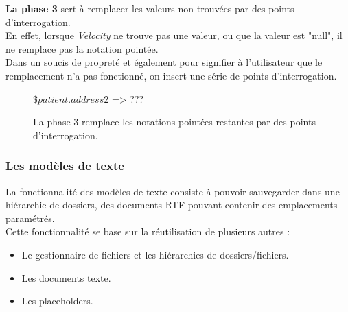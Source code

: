 \textbf{La phase 3} sert à remplacer les valeurs non trouvées par des points d'interrogation.\\
En effet, lorsque \textit{Velocity} ne trouve pas une valeur, ou que la valeur est "null", il ne remplace pas la notation pointée.\\
Dans un soucis de propreté et également pour signifier à l'utilisateur que le remplacement n'a pas fonctionné, on insert une série de points d'interrogation.
\begin{figure}[H]
  \color{darkgray} 
  \centering
  $\$patient.address2$ => $???$
  \caption{\color{black} \label{fig:annotations} La phase 3 remplace les notations pointées restantes par des points d'interrogation.}
\end{figure}




\subsubsection{Les modèles de texte}
La fonctionnalité des modèles de texte consiste à pouvoir sauvegarder dans une hiérarchie de dossiers, des documents RTF pouvant contenir des emplacements paramétrés.\\
Cette fonctionnalité se base sur la réutilisation de plusieurs autres :
\begin{itemize}
\item Le gestionnaire de fichiers et les hiérarchies de dossiers/fichiers.
\item Les documents texte.
\item Les placeholders.
\end{itemize}


